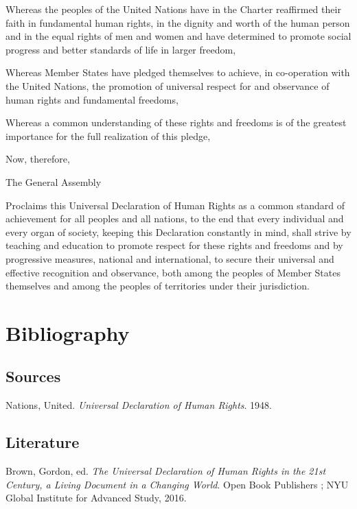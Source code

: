\documentclass[
  titlepage,
  openright,
  DIV=calc,
  toc=listof,
  listof=nochaptergap]{scrbook}
\newlength{\cslhangindent}
\newenvironment{CSLReferences}[2] %
 {\begin{list}{}{%
  \setlength{\itemindent}{0pt}
  \setlength{\leftmargin}{0pt}
  \setlength{\parsep}{0pt}
  \ifodd #1
   \setlength{\leftmargin}{\cslhangindent}
   \setlength{\itemindent}{-1\cslhangindent}
  \fi
  \setlength{\itemsep}{#2\baselineskip}}}
 {\end{list}}
\begin{document}
Whereas the peoples of the United Nations have in the Charter reaffirmed
their faith in fundamental human rights, in the dignity and worth of the
human person and in the equal rights of men and women and have
determined to promote social progress and better standards of life in
larger freedom,

Whereas Member States have pledged themselves to achieve, in
co-operation with the United Nations, the promotion of universal respect
for and observance of human rights and fundamental freedoms,

Whereas a common understanding of these rights and freedoms is of the
greatest importance for the full realization of this pledge,

Now, therefore,

The General Assembly

Proclaims this Universal Declaration of Human Rights as a common
standard of achievement for all peoples and all nations, to the end that
every individual and every organ of society, keeping this Declaration
constantly in mind, shall strive by teaching and education to promote
respect for these rights and freedoms and by progressive measures,
national and international, to secure their universal and effective
recognition and observance, both among the peoples of Member States
themselves and among the peoples of territories under their
jurisdiction.


\listoffigures

\chapter{Bibliography}\label{bibliography}

\section{Sources}\label{sources}

\label{refs_sources}
\begin{CSLReferences}{1}{1}
Nations, United. \emph{Universal {Declaration} of {Human} {Rights}}.
1948.

\end{CSLReferences}

\clearpage

\section{Literature}\label{literature}

\label{refs_main}
\begin{CSLReferences}{1}{1}
Brown, Gordon, ed. \emph{The {Universal} {Declaration} of {Human}
{Rights} in the 21st Century, a Living Document in a Changing World}.
Open Book Publishers ; NYU Global Institute for Advanced Study, 2016.

\end{CSLReferences}

\backmatter
\end{document}
